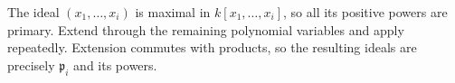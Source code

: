 The ideal $(x_1,\ldots,x_i)$ is maximal in $k[x_1,\ldots,x_i]$, so all its positive powers are primary. Extend through the remaining polynomial variables and apply  repeatedly. Extension commutes with products, so the resulting ideals are precisely $\mathfrak{p}_i$ and its powers.

